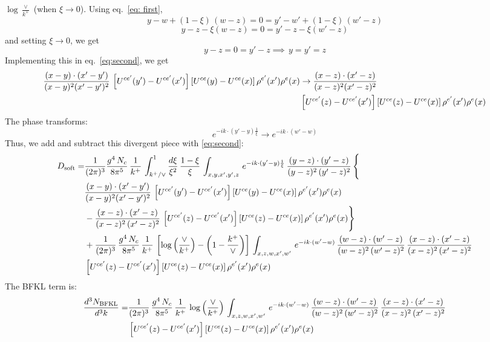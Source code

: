 \documentclass[9pt]{article}
\numberwithin{equation}{section}
\begin{document}
$\log{\frac{\vee}{k^{+}}}$ (when $\xi\to 0$). Using eq.~\eqref{eq: first},
$$y-w + (1-\xi)\, (w-z) = 0 = y'-w' + (1-\xi)\,(w'-z)$$
$$y-z - \xi (w-z) = 0 = y'-z -\xi (w'-z)$$
and setting $\xi\to 0$, we get
$$y-z = 0 = y'-z \implies\, y= y' = z$$
Implementing this in eq.~\eqref{eq:second}, we get
\begin{align}
\frac{(x-y)\cdot(x'-y')}{(x-y)^{2}(x'-y')^{2}}\,\left[U^{ce'}(y')-U^{ce'}(x')\right]\left[U^{ce}(y)-U^{ce}(x)\right]\rho^{e'}(x')\rho^{e}(x) &  \to \frac{(x-z)\cdot(x'-z)}{(x-z)^{2}(x'-z)^{2}}\notag \\ & \left[U^{ce'}(z)-U^{ce'}(x')\right]\left[U^{ce}(z)-U^{ce}(x)\right]\rho^{e'}(x')\rho^{e}(x)
\end{align}
The phase transforms:
$$e^{-ik\cdot(y'-y)\frac{1}{\xi}}\to e^{-ik\cdot (w'-w)}$$
Thus, we add and subtract this divergent piece with \eqref{eq:second}:
\begin{align}\label{eq:addsub}
    D_{\rm soft} = &\frac{1}{(2\pi)^{3}}\frac{g^{4}\,N_{c}}{8\pi^{5}}\,\frac{1}{k^{+}}\,\int_{k^{+}/\vee}^{1}\frac{d\xi}{\xi^{2}}\,\frac{1-\xi}{\xi}\,\int_{x,y,x',y',z}\,e^{-ik\cdot(y'-y)\frac{1}{\xi}}\,\frac{(y-z)\cdot (y'-z)}{(y-z)^{2}\, (y'-z)^{2}}\,\Bigg\{\notag \\ & \frac{(x-y)\cdot(x'-y')}{(x-y)^{2}(x'-y')^{2}}\,\left[U^{ce'}(y')-U^{ce'}(x')\right]\left[U^{ce}(y)-U^{ce}(x)\right]\rho^{e'}(x')\rho^{e}(x)\notag \\ & - \frac{(x-z)\cdot (x'-z)}{(x-z)^{2}\, (x'-z)^{2}}\,\left[U^{ce'}(z)-U^{ce'}(x')\right]\left[U^{ce}(z)-U^{ce}(x)\right]\rho^{e'}(x')\rho^{e}(x)\Bigg\}\notag \\ & +\frac{1}{(2\pi)^{3}}\, \frac{g^{4}\,N_{c}}{8\pi^{5}}\,\frac{1}{k^{+}}\,\left[\log{\left(\frac{\vee}{k^{+}}\right)}-\left(1-\frac{k^{+}}{\vee}\right)\right]\,\int_{x,z,w,x',w'}\,e^{-ik\cdot (w'-w)}\,\frac{(w-z)\cdot (w'-z)}{(w-z)^{2}\,(w'-z)^{2}}\, \frac{(x-z)\cdot (x'-z)}{(x-z)^{2}\,(x'-z)^{2}}\notag \\ & \left[U^{ce'}(z)-U^{ce'}(x')\right]\left[U^{ce}(z)-U^{ce}(x)\right]\rho^{e'}(x')\rho^{e}(x)
\end{align}
The BFKL term is:
\begin{align}
  \frac{d^{3}N_{\rm BFKL}}{d^{3}k} = &   \frac{1}{(2\pi)^{3}}\, \frac{g^{4}\,N_{c}}{8\pi^{5}}\,\frac{1}{k^{+}}\,\log{\left(\frac{\vee}{k^{+}}\right)}\,\int_{x,z,w,x',w'}\,e^{-ik\cdot (w'-w)}\,\frac{(w-z)\cdot (w'-z)}{(w-z)^{2}\,(w'-z)^{2}}\, \frac{(x-z)\cdot (x'-z)}{(x-z)^{2}\,(x'-z)^{2}}\notag \\ & \left[U^{ce'}(z)-U^{ce'}(x')\right]\left[U^{ce}(z)-U^{ce}(x)\right]\rho^{e'}(x')\rho^{e}(x)
\end{align}
\end{document}
